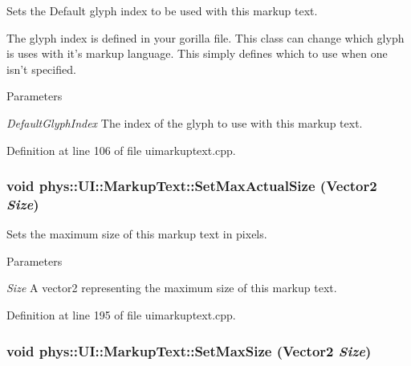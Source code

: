 Sets the Default glyph index to be used with this markup text. 

The glyph index is defined in your gorilla file. This class can change which glyph is uses with it's markup language. This simply defines which to use when one isn't specified. 
\begin{DoxyParams}{Parameters}
\item[{\em DefaultGlyphIndex}]The index of the glyph to use with this markup text. \end{DoxyParams}


Definition at line 106 of file uimarkuptext.cpp.

\hypertarget{classphys_1_1UI_1_1MarkupText_aca214ea8e68d56c6a0747f9854fa5034}{
\subsubsection[{SetMaxActualSize}]{\setlength{\rightskip}{0pt plus 5cm}void phys::UI::MarkupText::SetMaxActualSize ({\bf Vector2} {\em Size})}}
\label{d7/d23/classphys_1_1UI_1_1MarkupText_aca214ea8e68d56c6a0747f9854fa5034}


Sets the maximum size of this markup text in pixels. 


\begin{DoxyParams}{Parameters}
\item[{\em Size}]A vector2 representing the maximum size of this markup text. \end{DoxyParams}


Definition at line 195 of file uimarkuptext.cpp.

\hypertarget{classphys_1_1UI_1_1MarkupText_a4e7ebb993d6c553a3734efc5cae896f3}{
\subsubsection[{SetMaxSize}]{\setlength{\rightskip}{0pt plus 5cm}void phys::UI::MarkupText::SetMaxSize ({\bf Vector2} {\em Size})}}
\label{d7/d23/classphys_1_1UI_1_1MarkupText_a4e7ebb993d6c553a3734efc5cae896f3}


